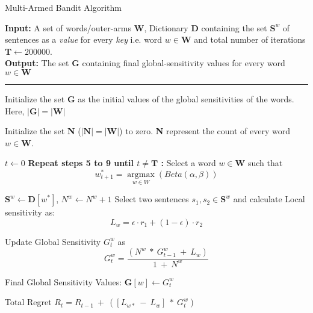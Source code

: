 \begin{algorithm}[htbp]
    \caption{Multi-Armed Bandit Algorithm}
    \label{algo:SMAB}
    \textbf{Input: } A set of words/outer-arms \textbf{W}, Dictionary \textbf{D} containing the set $\textbf{S}^{w}$ of sentences as a \textit{value} for every \textit{key} i.e. word $w \in \textbf{W}$ and total number of iterations $\textbf{T} \gets 200000$.\\
    \textbf{Output: } The set \textbf{G} containing final global-sensitivity values for every word $w \in \textbf{W}$
    \vspace{0.1cm}
    \hrule %
    \vspace{0.1cm}

    \begin{algorithmic}[1]
        \State Initialize the set \textbf{G} as the initial values of the global sensitivities of the words. Here, $|\textbf{G}| = |\textbf{W}|$

        \State Initialize the set \textbf{N} ($|\textbf{N}| = |\textbf{W}|$) to zero. \textbf{N} represent the count of every word $w \in \textbf{W}$.

        \State $t \gets 0$
        \State \textbf{Repeat steps 5 to 9 until $t \neq \textbf{T}$ :}
        \State Select a word $w \in \textbf{W}$ such that 
        \begin{equation*}
            w^*_{t+1} = \operatorname*{argmax}_{w \in W} \left( Beta(\alpha, \beta) \right)
        \end{equation*}
    
        \State $\textbf{S}^{w} \gets \textbf{D}[w^{*}]$, $N^w \gets N^w + 1$
        \State Select two sentences \( s_1, s_2 \in \textbf{S}^{w} \) and calculate Local sensitivity as:
\begin{equation*}
    L_w = \epsilon \cdot r_1 + (1-\epsilon) \cdot r_2
\end{equation*}

        \State Update Global Sensitivity $G^w_t$ as
        \begin{equation*}
            G^{w}_{t} = \frac{(N^w \:* \:G^{w}_{t - 1} \: + \: L_{w})}{ 1 \:+ \:N^w}
        \end{equation*}

        \State Final Global Sensitivity Values: $\textbf{G}[w] \gets G^{w}_{t}$ 

        \State Total Regret $R_t = R_{t-1} \: + \: ([L_{w*}\: - \: L_{w}] \: * \: G^w_t)$
    \end{algorithmic}
\end{algorithm}

